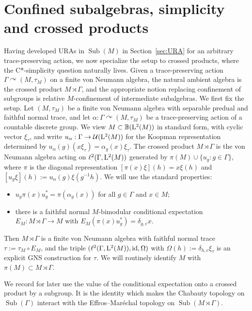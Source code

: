 \documentclass[12pt]{amsart} %
\theoremstyle{plain}
\theoremstyle{definition}
\newcommand{\Lcal}{\mathbb{B}}
\newcommand{\id}{{\rm id}}
\DeclareMathOperator{\Sub}{Sub}
\begin{document}
\section{Confined subalgebras, simplicity and crossed products}
\label{sec:crossedproduct}
Having developed URAs in $\Sub(M)$ in Section~\ref{sec:URA} for an arbitrary trace-preserving action, we now specialize the setup to crossed products, where the C*-simplicity question naturally lives. Given a trace-preserving action $\Gamma\curvearrowright (M,\tau_M)$ on a finite von Neumann algebra, the natural ambient algebra is the crossed product $M\rtimes\Gamma$, and the appropriate notion replacing confinement of subgroups is relative $M$-confinement of intermediate subalgebras. We first fix the setup.
Let $(M,\tau_M)$ be a finite von Neumann algebra with separable predual and faithful normal trace, and let $\alpha:\Gamma\curvearrowright (M,\tau_M)$ be a trace-preserving action of a countable discrete group. We view $M\subset\Lcal({\rm L}^2(M))$ in standard form, with cyclic vector $\xi_\tau$, and write $u_\alpha:\Gamma\rightarrow\mathcal{U}({\rm L}^2(M))$ for the Koopman representation determined by $u_\alpha(g)(x\xi_\tau)=\alpha_g(x)\xi_\tau$. The crossed product $M\rtimes\Gamma$ is the von Neumann algebra acting on $\ell^2(\Gamma,{\rm L}^2(M))$ generated by $\pi(M)\cup\{u_g:g\in\Gamma\}$, where $\pi$ is the diagonal representation $[\pi(x)\xi](h)=x\xi(h)$ and $[u_g\xi](h):=u_\alpha(g)\xi(g^{-1}h)$. We will use the standard properties:
\begin{itemize}
\item $u_g\pi(x)u_g^*=\pi(\alpha_g(x))$ for all $g\in\Gamma$ and $x\in M$;
\item there is a faithful normal $M$-bimodular conditional expectation $E_M:M\rtimes\Gamma\rightarrow M$ with $E_M(\pi(x)u_g^*)=\delta_{g,e}x$.
\end{itemize}
Then $M\rtimes\Gamma$ is a finite von Neumann algebra with faithful normal trace $\tau:=\tau_M\circ E_M$, and the triple $(\ell^2(\Gamma,{\rm L}^2(M)),\id,\Omega)$ with $\Omega(h):=\delta_{h,e}\xi_\tau$ is an explicit GNS construction for $\tau$. We will routinely identify $M$ with $\pi(M)\subset M\rtimes\Gamma$.

\noindent We record for later use the value of the conditional expectation onto
a crossed product by a subgroup. It is the identity which makes the Chabauty
topology on $\Sub(\Gamma)$ interact with the Effros--Mar\'echal topology on
$\Sub(M\rtimes\Gamma)$.
\medskip
\end{document}
